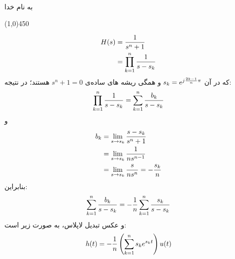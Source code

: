 \documentclass[50pt]{article}
\newcommand{\hl}{
\begin{center}
\line(1,0){450}
\end{center}}
\begin{document}





\setLTR 




\begin{RTL}
\Large{








\begin{center}
به نام خدا


\end{center}
\hl
\[
\begin{split}
H(s)&={1\over s^n+1}
\\&= \prod_{k=1}^{n}{1\over s-s_k}
\end{split}
\]
که در آن 
$
s_k=e^{j{2k-1\over n}\pi}
$
  و همگی ریشه های ساده‌ی $s^n+1=0$ هستند؛ در نتیجه:
\[
\begin{split}
\prod_{k=1}^{n}{1\over s-s_k}=\sum_{k=1}^n {b_k\over s-s_k}
\end{split}
\]
و
\[
\begin{split}
b_k&=\lim_{s\to s_k}{s-s_k\over s^n+1}
\\&=\lim_{s\to s_k}{1\over ns^{n-1}}
\\&=\lim_{s\to s_k}{s\over ns^{n}}=-{s_k\over n}
\end{split}
\]
بنابراین:
\[
\sum_{k=1}^n {b_k\over s-s_k}=-{1\over n}\sum_{k=1}^{n} {s_k\over s-s_k}
\]
و عکس تبدیل لاپلاس، به صورت زیر است:
\[
h(t)=-{1\over n}\left(\sum_{k=1}^{n} s_k e^{s_k t}\right)u(t)
\]







}





\end{RTL}
\end{document}
